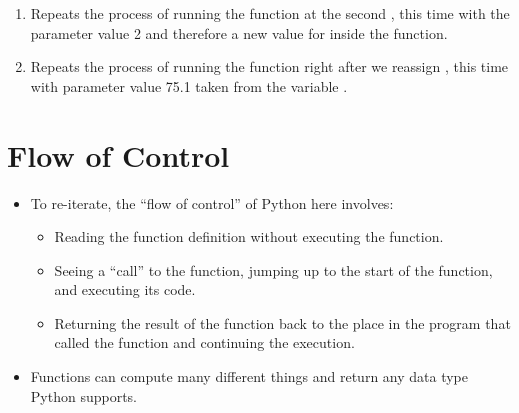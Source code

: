 \documentclass[letterpaper,10pt,english]{sphinxmanual}
\begin{document}
\begin{enumerate}
\begin{itemize}
\end{itemize}

\item {} 
Repeats the process of running the function at the second
, this time with the parameter value 2 and therefore a
new value for  inside the function.

\item {} 
Repeats the process of running the function right after we reassign
, this time with parameter value 75.1 taken from the variable
.

\end{enumerate}


\section{Flow of Control}
\label{\detokenize{lecture_notes/lec05_functions2:flow-of-control}}\begin{itemize}
\item {} 
To re-iterate, the “flow of control” of Python here involves:
\begin{itemize}
\item {} 
Reading the function definition without executing the function.

\item {} 
Seeing a “call” to the function, jumping up to the start of the
function, and executing its code.

\item {} 
Returning the result of the function back to the place in the
program that called the function and continuing the execution.

\end{itemize}

\item {} 
Functions can compute many different things and return any data type
Python supports.

\end{itemize}
\end{document}
